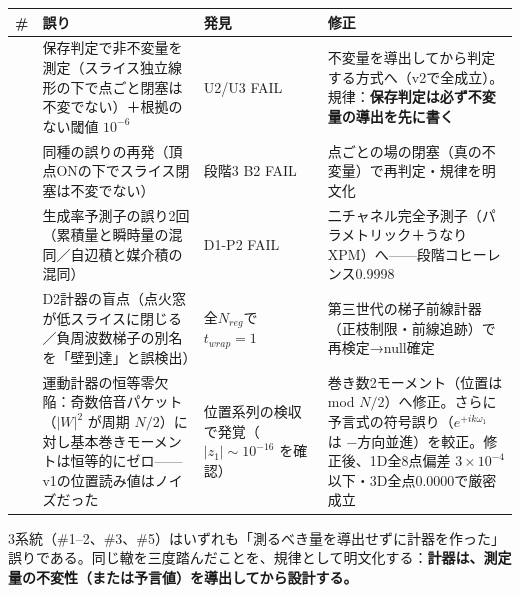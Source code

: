 \documentclass[
  a4paper,
]{ltjsarticle}
\newcounter{none} %
\begin{document}
{\def\LTcaptype{none} %
\begin{longtable}[]{@{}
  >{\raggedright\arraybackslash}p{}
  >{\raggedright\arraybackslash}p{}
  >{\raggedright\arraybackslash}p{}
  >{\raggedright\arraybackslash}p{}@{}}
\toprule\noalign{}
\begin{minipage}[b]{\linewidth}\raggedright
\#
\end{minipage} & \begin{minipage}[b]{\linewidth}\raggedright
誤り
\end{minipage} & \begin{minipage}[b]{\linewidth}\raggedright
発見
\end{minipage} & \begin{minipage}[b]{\linewidth}\raggedright
修正
\end{minipage} \\
\midrule\noalign{}
\endhead
\bottomrule\noalign{}
\endlastfoot
1 &
保存判定で非不変量を測定（スライス独立線形の下で点ごと閉塞は不変でない）＋根拠のない閾値
\(10^{-6}\) & U2/U3 FAIL &
不変量を導出してから判定する方式へ（v2で全成立）。規律：\textbf{保存判定は必ず不変量の導出を先に書く} \\
2 & 同種の誤りの再発（頂点ONの下でスライス閉塞は不変でない） & 段階3 B2
FAIL & 点ごとの場の閉塞（真の不変量）で再判定・規律を明文化 \\
3 & 生成率予測子の誤り2回（累積量と瞬時量の混同／自辺積と媒介積の混同）
& D1-P2 FAIL &
二チャネル完全予測子（パラメトリック＋うなりXPM）へ------段階コヒーレンス0.9998 \\
4 &
D2計器の盲点（点火窓が低スライスに閉じる／負周波数梯子の別名を「壁到達」と誤検出）
& 全\(N_{reg}\)で \(t_{wrap}=1\) &
第三世代の梯子前線計器（正枝制限・前線追跡）で再検定→null確定 \\
5 & 運動計器の恒等零欠陥：奇数倍音パケット（\(|W|^2\) が周期
\(N/2\)）に対し基本巻きモーメントは恒等的にゼロ------v1の位置読み値はノイズだった
& 位置系列の検収で発覚（\(|z_1|\sim10^{-16}\) を確認） &
巻き数2モーメント（位置は mod
\(N/2\)）へ修正。さらに予言式の符号誤り（\(e^{+ik\omega_1}\) は
\(-\)方向並進）を較正。修正後、1D全8点偏差 \(3\times10^{-4}\)
以下・3D全点0.0000で厳密成立 \\
\end{longtable}
}

3系統（\#1--2、\#3、\#5）はいずれも「測るべき量を導出せずに計器を作った」誤りである。同じ轍を三度踏んだことを、規律として明文化する：\textbf{計器は、測定量の不変性（または予言値）を導出してから設計する。}
\end{document}
